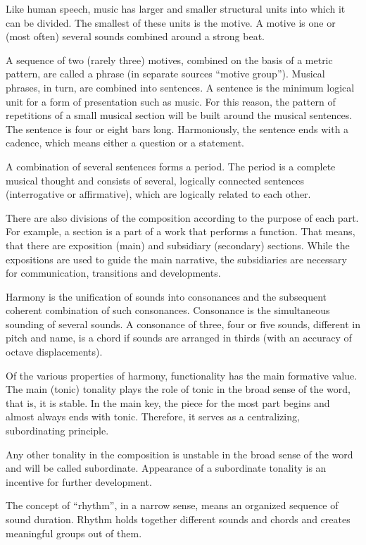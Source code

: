 \documentclass[thesis=B,english]{FITthesis}[2019/12/23]
\begin{document}
Like human speech, music has larger and smaller structural units into which it can be divided. The smallest of these units is the motive. A motive is one or (most often) several sounds combined around a strong beat.

A sequence of two (rarely three) motives, combined on the basis of a metric pattern, are called a phrase (in separate sources “motive group”). Musical phrases, in turn, are combined into sentences. A sentence is the minimum logical unit for a form of presentation such as music. For this reason, the pattern of repetitions of a small musical section will be built around the musical sentences. The sentence is four or eight bars long. Harmoniously, the sentence ends with a cadence, which means either a question or a statement.

A combination of several sentences forms a period. The period is a complete musical thought and consists of several, logically connected sentences (interrogative or affirmative), which are logically related to each other.

There are also divisions of the composition according to the purpose of each part. For example, a section is a part of a work that performs a function. That means, that there are exposition (main) and subsidiary (secondary) sections. While the expositions are used to guide the main narrative, the subsidiaries are necessary for communication, transitions and developments.

Harmony is the unification of sounds into consonances and the subsequent coherent combination of such consonances. Consonance is the simultaneous sounding of several sounds. A consonance of three, four or five sounds, different in pitch and name, is a chord if sounds are arranged in thirds (with an accuracy of octave displacements).

Of the various properties of harmony, functionality has the main formative value. The main (tonic) tonality plays the role of tonic in the broad sense of the word, that is, it is stable. In the main key, the piece for the most part begins and almost always ends with tonic. Therefore, it serves as a centralizing, subordinating principle.

Any other tonality in the composition is unstable in the broad sense of the word and will be called subordinate. Appearance of a subordinate tonality is an incentive for further development.
      
The concept of “rhythm”, in a narrow sense, means an organized sequence of sound duration. Rhythm holds together different sounds and chords and creates meaningful groups out of them.
\end{document}
